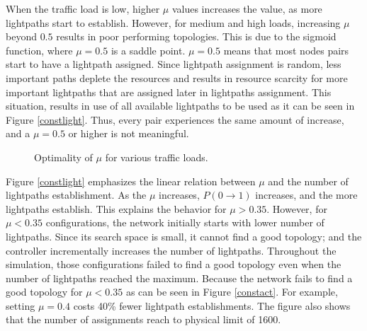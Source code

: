 \documentclass[conference]{IEEEtran}
\begin{document}
When the traffic load is low, higher $\mu$ values increases the value, as more lightpaths start to establish. 
However, for medium and high loads, increasing $\mu$ beyond $0.5$ results in poor performing topologies. 
 This is due to the sigmoid function, where $\mu=0.5$ is a saddle point. $\mu=0.5$ means that most nodes pairs start to have a lightpath assigned. 
Since lightpath assignment is random, less important paths deplete the resources and results in resource scarcity for more important lightpaths that are assigned later in lightpaths assignment.
This situation, results in use of all available lightpaths to be used as it can be seen in Figure \ref{constlight}.
Thus, every pair  experiences the same amount of increase, and a $\mu=0.5$ or higher is not meaningful.
\begin{figure*}[thb]
\centering
 \def\mywidth{0.3}
\hfill
  \hfill
{}
\label{diffload}
 \caption{Optimality of $\mu$  for various traffic loads.
 }
\end{figure*}
 
 
Figure \ref{constlight} emphasizes the linear relation between $\mu$ and the number of lightpaths establishment. 
As the $\mu$ increases, $P(0\rightarrow1)$ increases, and the more lightpaths establish. This explains the behavior for $\mu>0.35$.
However, for $\mu<0.35$ configurations, the network initially starts with lower number of lightpaths.
Since its search space is small, it cannot find a good topology; and the controller incrementally increases the number of lightpaths. Throughout the simulation,
those configurations failed to find a good topology even when the number of lightpaths reached the maximum. 
Because the network fails to find a good topology for $\mu<0.35$ as can be seen in Figure  \ref{constact}.
For example, setting $\mu=0.4$ costs 40\% fewer lightpath establishments.
  The figure also shows  that the number of assignments reach to physical limit of 1600.
  
\end{document}
